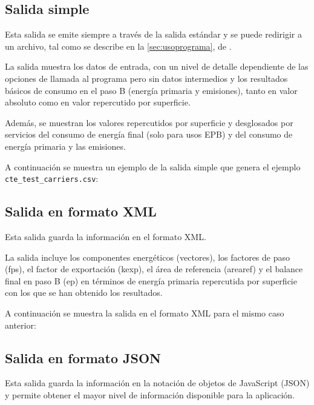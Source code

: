 \documentclass[10pt,notitlepage,oneside,a4paper]{article}
\begin{document}
\subsection{Salida simple}

Esta salida se emite siempre a través de la salida estándar y se puede redirigir a un archivo, tal como se describe en la \autoref{sec:usoprograma}, de .

La salida muestra los datos de entrada, con un nivel de detalle dependiente de las opciones de llamada al programa pero sin datos intermedios y los resultados básicos de consumo en el paso B (energía primaria y emisiones), tanto en valor absoluto como en valor repercutido por superficie.

Además, se muestran los valores repercutidos por superficie y desglosados por servicios del consumo de energía final (solo para usos EPB) y del consumo de energía primaria y las emisiones.

A continuación se muestra un ejemplo de la salida simple que genera el ejemplo \texttt{cte\_test\_carriers.csv}:



\newpage
\subsection{Salida en formato XML}
\label{subsec:formatoxml}

Esta salida guarda la información en el formato XML.

La salida incluye los componentes energéticos (vectores), los factores de paso (fps), el factor de exportación (kexp), el área de referencia (arearef) y el balance final en paso B (ep) en términos de energía primaria repercutida por superficie  con los que se han obtenido los resultados.

A continuación se muestra la salida en el formato XML para el mismo caso anterior:



\newpage
\subsection{Salida en formato JSON}
\label{subsec:formatojson}

Esta salida guarda la información en la notación de objetos de JavaScript (JSON) y permite obtener el mayor nivel de información disponible para la aplicación.
\end{document}
